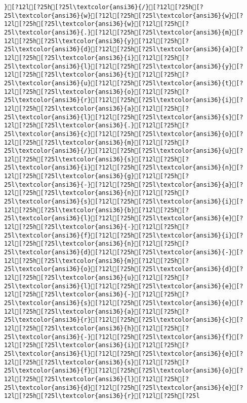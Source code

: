 \documentclass{scrartcl}
\begin{document}
\begin{Verbatim}
}[?12l[?25h[?25l\textcolor{ansi36}{/}[?12l[?25h[?25l\textcolor{ansi36}{w}[?12l[?25h[?25l\textcolor{ansi36}{w}[?12l[?25h[?25l\textcolor{ansi36}{w}[?12l[?25h[?25l\textcolor{ansi36}{.}[?12l[?25h[?25l\textcolor{ansi36}{m}[?12l[?25h[?25l\textcolor{ansi36}{y}[?12l[?25h[?25l\textcolor{ansi36}{d}[?12l[?25h[?25l\textcolor{ansi36}{a}[?12l[?25h[?25l\textcolor{ansi36}{i}[?12l[?25h[?25l\textcolor{ansi36}{l}[?12l[?25h[?25l\textcolor{ansi36}{y}[?12l[?25h[?25l\textcolor{ansi36}{t}[?12l[?25h[?25l\textcolor{ansi36}{u}[?12l[?25h[?25l\textcolor{ansi36}{t}[?12l[?25h[?25l\textcolor{ansi36}{o}[?12l[?25h[?25l\textcolor{ansi36}{r}[?12l[?25h[?25l\textcolor{ansi36}{i}[?12l[?25h[?25l\textcolor{ansi36}{a}[?12l[?25h[?25l\textcolor{ansi36}{l}[?12l[?25h[?25l\textcolor{ansi36}{s}[?12l[?25h[?25l\textcolor{ansi36}{.}[?12l[?25h[?25l\textcolor{ansi36}{c}[?12l[?25h[?25l\textcolor{ansi36}{o}[?12l[?25h[?25l\textcolor{ansi36}{m}[?12l[?25h[?25l\textcolor{ansi36}{/}[?12l[?25h[?25l\textcolor{ansi36}{u}[?12l[?25h[?25l\textcolor{ansi36}{s}[?12l[?25h[?25l\textcolor{ansi36}{i}[?12l[?25h[?25l\textcolor{ansi36}{n}[?12l[?25h[?25l\textcolor{ansi36}{g}[?12l[?25h[?25l\textcolor{ansi36}{-}[?12l[?25h[?25l\textcolor{ansi36}{a}[?12l[?25h[?25l\textcolor{ansi36}{n}[?12l[?25h[?25l\textcolor{ansi36}{s}[?12l[?25h[?25l\textcolor{ansi36}{i}[?12l[?25h[?25l\textcolor{ansi36}{b}[?12l[?25h[?25l\textcolor{ansi36}{l}[?12l[?25h[?25l\textcolor{ansi36}{e}[?12l[?25h[?25l\textcolor{ansi36}{-}[?12l[?25h[?25l\textcolor{ansi36}{f}[?12l[?25h[?25l\textcolor{ansi36}{i}[?12l[?25h[?25l\textcolor{ansi36}{n}[?12l[?25h[?25l\textcolor{ansi36}{d}[?12l[?25h[?25l\textcolor{ansi36}{-}[?12l[?25h[?25l\textcolor{ansi36}{m}[?12l[?25h[?25l\textcolor{ansi36}{o}[?12l[?25h[?25l\textcolor{ansi36}{d}[?12l[?25h[?25l\textcolor{ansi36}{u}[?12l[?25h[?25l\textcolor{ansi36}{l}[?12l[?25h[?25l\textcolor{ansi36}{e}[?12l[?25h[?25l\textcolor{ansi36}{-}[?12l[?25h[?25l\textcolor{ansi36}{s}[?12l[?25h[?25l\textcolor{ansi36}{e}[?12l[?25h[?25l\textcolor{ansi36}{a}[?12l[?25h[?25l\textcolor{ansi36}{r}[?12l[?25h[?25l\textcolor{ansi36}{c}[?12l[?25h[?25l\textcolor{ansi36}{h}[?12l[?25h[?25l\textcolor{ansi36}{-}[?12l[?25h[?25l\textcolor{ansi36}{f}[?12l[?25h[?25l\textcolor{ansi36}{i}[?12l[?25h[?25l\textcolor{ansi36}{l}[?12l[?25h[?25l\textcolor{ansi36}{e}[?12l[?25h[?25l\textcolor{ansi36}{s}[?12l[?25h[?25l\textcolor{ansi36}{f}[?12l[?25h[?25l\textcolor{ansi36}{o}[?12l[?25h[?25l\textcolor{ansi36}{l}[?12l[?25h[?25l\textcolor{ansi36}{d}[?12l[?25h[?25l\textcolor{ansi36}{e}[?12l[?25h[?25l\textcolor{ansi36}{r}[?12l[?25h[?25l

\end{Verbatim}
\end{document}
